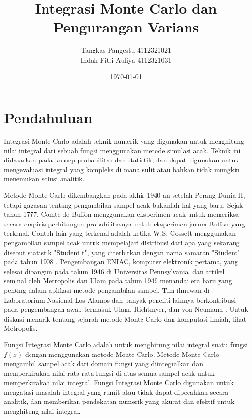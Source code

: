 \documentclass[a4paper,12pt]{article}
\theoremstyle{definition}
\begin{document}
    \title{Integrasi Monte Carlo dan Pengurangan Varians}
    \author{Tangkas Pangestu 4112321021\\
    Indah Fitri Auliya 4112321031}
\date{\today}
\begin{titlepage}
    \maketitle
\end{titlepage}

\section{Pendahuluan}
Integrasi Monte Carlo adalah teknik numerik yang digunakan untuk menghitung nilai integral dari sebuah fungsi menggunakan metode simulasi acak. Teknik ini didasarkan pada konsep probabilitas dan statistik, dan dapat digunakan untuk mengevaluasi integral yang kompleks di mana sulit atau bahkan tidak mungkin menemukan solusi analitik.

Metode Monte Carlo dikembangkan pada akhir 1940-an setelah Perang Dunia II, tetapi gagasan tentang pengambilan sampel acak bukanlah hal yang baru. Sejak tahun 1777, Comte de Buffon menggunakan eksperimen acak untuk memeriksa secara empiris perhitungan probabilitasnya untuk eksperimen jarum Buffon yang terkenal. Contoh lain yang terkenal adalah ketika W.S. Gossett menggunakan pengambilan sampel acak untuk mempelajari distribusi dari apa yang sekarang disebut statistik "Student t", yang diterbitkan dengan nama samaran "Student" pada tahun 1908 \citep{Student1908}. Pengembangan ENIAC, komputer elektronik pertama, yang selesai dibangun pada tahun 1946 di Universitas Pennsylvania, dan artikel seminal oleh Metropolis dan Ulam pada tahun 1949 menandai era baru yang penting dalam aplikasi metode pengambilan sampel. Tim ilmuwan di Laboratorium Nasional Los Alamos dan banyak peneliti lainnya berkontribusi pada pengembangan awal, termasuk Ulam, Richtmyer, dan von Neumann \citep{Ulam1947}. Untuk diskusi menarik tentang sejarah metode Monte Carlo dan komputasi ilmiah, lihat Metropolis\citep{Metropolis1987}.

Fungsi Integrasi Monte Carlo adalah untuk menghitung nilai integral suatu fungsi $f(x)$ dengan menggunakan metode Monte Carlo. Metode Monte Carlo mengambil sampel acak dari domain fungsi yang diintegralkan dan memperkirakan nilai rata-rata fungsi di atas semua sampel acak untuk memperkirakan nilai integral. Fungsi Integrasi Monte Carlo digunakan untuk mengatasi masalah integral yang rumit atau tidak dapat dipecahkan secara analitik, dan memberikan pendekatan numerik yang akurat dan efektif untuk menghitung nilai integral.
\end{document}
